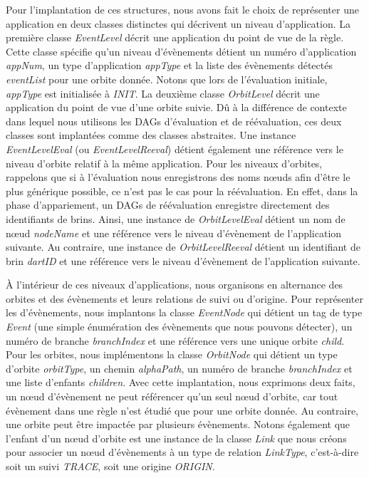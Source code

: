 Pour l'implantation de ces structures, nous avons fait le choix de représenter
une application en deux classes distinctes qui décrivent un niveau
d'application. %
La première classe \textit{EventLevel} décrit une application du point de vue de
la règle. %
Cette classe spécifie qu'un niveau d'évènements détient un numéro d'application
\textit{appNum}, un type d'application \textit{appType} et la liste des
évènements détectés \textit{eventList} pour une orbite donnée. %
Notons que lors de l'évaluation initiale, \textit{appType} est initialisée à
\textit{INIT}. %
La deuxième classe \textit{OrbitLevel} décrit une application du point de vue
d'une orbite suivie. %
Dû à la différence de contexte dans lequel nous utilisons les DAGs d'évaluation
et de réévaluation, ces deux classes sont implantées comme des classes
abstraites. %
Une instance \textit{EventLevelEval} (ou \textit{EventLevelReeval}) détient
également une référence vers le niveau d'orbite relatif à la même application. %
Pour les niveaux d'orbites, rappelons que si à l'évaluation nous enregistrons
des noms n\oe uds afin d'être le plus générique possible, ce n'est pas le cas
pour la réévaluation. %
En effet, dans la phase d'appariement, un DAGs de réévaluation enregistre
directement des identifiants de brins. %
Ainsi, une instance de \textit{OrbitLevelEval} détient un nom de n\oe ud
\textit{nodeName} et une référence vers le niveau d'évènement de l'application
suivante. %
Au contraire, une instance de \textit{OrbitLevelReeval} détient un identifiant
de brin \textit{dartID} et une référence vers le niveau d'évènement de
l'application suivante. %

À l'intérieur de ces niveaux d'applications, nous organisons en alternance des
orbites et des évènements et leurs relations de suivi ou d'origine. %
Pour représenter les d'évènements, nous implantons la classe \textit{EventNode}
qui détient un tag de type \textit{Event} (une simple énumération des évènements
que nous pouvons détecter), un numéro de branche \textit{branchIndex} et une
référence vers une unique orbite \textit{child}. %
Pour les orbites, nous implémentons la classe \textit{OrbitNode} qui détient un
type d'orbite \textit{orbitType}, un chemin \textit{alphaPath}, un numéro de
branche \textit{branchIndex} et une liste d'enfants \textit{children}. %
Avec cette implantation, nous exprimons deux faits, un n\oe ud d'évènement ne
peut référencer qu'un seul n\oe ud d'orbite, car tout évènement dans une règle
n'est étudié que pour une orbite donnée. %
Au contraire, une orbite peut être impactée par plusieurs évènements. %
Notons également que l'enfant d'un n\oe ud d'orbite est une instance de la
classe \textit{Link} que nous créons pour associer un n\oe ud d'évènements à un
type de relation \textit{LinkType}, c'est-à-dire soit un suivi \textit{TRACE},
soit une origine \textit{ORIGIN}. %

